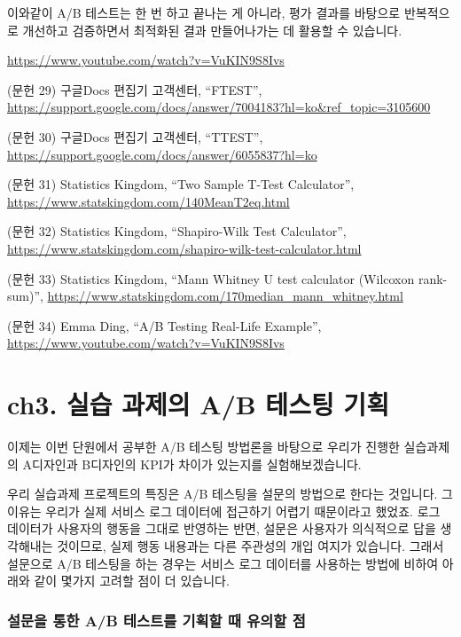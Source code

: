 \documentclass[
  letterpaper,
]{book}
\begin{document}
이와같이 A/B 테스트는 한 번 하고 끝나는 게 아니라, 평가 결과를 바탕으로
반복적으로 개선하고 검증하면서 최적화된 결과 만들어나가는 데 활용할 수
있습니다.

\url{https://www.youtube.com/watch?v=VuKIN9S8Ivs}

(문헌 29) 구글Docs 편집기 고객센터, ``FTEST'',
\url{https://support.google.com/docs/answer/7004183?hl=ko&ref_topic=3105600}

(문헌 30) 구글Docs 편집기 고객센터, ``TTEST'',
\url{https://support.google.com/docs/answer/6055837?hl=ko}

(문헌 31) Statistics Kingdom, ``Two Sample T-Test Calculator'',
\url{https://www.statskingdom.com/140MeanT2eq.html}

(문헌 32) Statistics Kingdom, ``Shapiro-Wilk Test Calculator'',
\url{https://www.statskingdom.com/shapiro-wilk-test-calculator.html}

(문헌 33) Statistics Kingdom, ``Mann Whitney U test calculator (Wilcoxon
rank-sum)'',
\url{https://www.statskingdom.com/170median_mann_whitney.html}

(문헌 34) Emma Ding, ``A/B Testing Real-Life Example'',
\url{https://www.youtube.com/watch?v=VuKIN9S8Ivs}

\chapter{ch3. 실습 과제의 A/B 테스팅
기획}\label{ch3.-uxc2e4uxc2b5-uxacfcuxc81cuxc758-ab-uxd14cuxc2a4uxd305-uxae30uxd68d}

이제는 이번 단원에서 공부한 A/B 테스팅 방법론을 바탕으로 우리가 진행한
실습과제의 A디자인과 B디자인의 KPI가 차이가 있는지를 실험해보겠습니다.

우리 실습과제 프로젝트의 특징은 A/B 테스팅을 설문의 방법으로 한다는
것입니다. 그 이유는 우리가 실제 서비스 로그 데이터에 접근하기 어렵기
때문이라고 했었죠. 로그 데이터가 사용자의 행동을 그대로 반영하는 반면,
설문은 사용자가 의식적으로 답을 생각해내는 것이므로, 실제 행동 내용과는
다른 주관성의 개입 여지가 있습니다. 그래서 설문으로 A/B 테스팅을 하는
경우는 서비스 로그 데이터를 사용하는 방법에 비하여 아래와 같이 몇가지
고려할 점이 더 있습니다.

\subsection{설문을 통한 A/B 테스트를 기획할 때 유의할
점}\label{uxc124uxbb38uxc744-uxd1b5uxd55c-ab-uxd14cuxc2a4uxd2b8uxb97c-uxae30uxd68duxd560-uxb54c-uxc720uxc758uxd560-uxc810}
\end{document}
